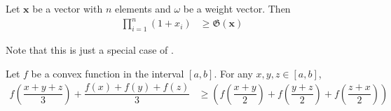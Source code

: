 \documentclass{subfile}
\begin{document}
		\begin{theorem}
			Let $\mathbf{x}$ be a vector with $n$ elements and $\omega$ be a weight vector. Then
				\begin{align*}
					\prod_{i=1}^{n}(1+x_{i})
						& \geq \mathfrak{G}(\mathbf{x})
				\end{align*}
		\end{theorem}
	Note that this is just a special case of .
		\begin{theorem}
			Let $f$ be a convex function in the interval $[a,b]$. For any $x,y,z\in[a,b]$,
				\begin{align*}
					f\left(\dfrac{x+y+z}{3}\right)+\dfrac{f(x)+f(y)+f(z)}{3}
						& \geq \left(f\left(\dfrac{x+y}{2}\right)+f\left(\dfrac{y+z}{2}\right)+f\left(\dfrac{z+x}{2}\right)\right)
				\end{align*}
		\end{theorem}
\end{document}
